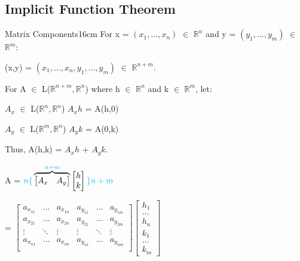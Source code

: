     \vspace{0.5cm}




    
\subsection{ Implicit Function Theorem }

    \begin{definition}{Matrix Components}{16cm}
        For x = $(x_1,...,x_n)$ $\in$ $\mathbb{R}^n$ and
        y = $(y_1,...,y_m)$ $\in$ $\mathbb{R}^m$:

        \hspace{0.5cm}
        (x,y) = $(x_1,...,x_n,y_1,...,y_m)$ $\in$ $\mathbb{R}^{n+m}$.

        For A $\in$ L($\mathbb{R}^{n+m},\mathbb{R}^n$)
        where h $\in$ $\mathbb{R}^n$ and k $\in$ $\mathbb{R}^m$, let:

        \hspace{0.5cm}
        $A_x$ $\in$ L($\mathbb{R}^n,\mathbb{R}^n$)
        \hspace{1cm}
        $A_xh$ = A(h,0)
        
        \hspace{0.5cm}
        $A_y$ $\in$ L($\mathbb{R}^m,\mathbb{R}^n$)
        \hspace{1cm}
        $A_yk$ = A(0,k)

        Thus, A(h,k) = $A_xh$ + $A_yk$.

        \hspace{0.5cm}
        A =
        ${\color{lblue} n \lbrace}
        \overbrace{\begin{bmatrix}
                        A_x & A_y
                    \end{bmatrix}}^{{\color{lblue} n+m}}
        \begin{bmatrix}
            h \\
            k
        \end{bmatrix} {\color{lblue} \rbrace n+m}$
        
        \hspace{0.9cm}
        =
        $\begin{bmatrix}
            a_{x_{11}} & ... & a_{x_{1n}} & a_{y_{11}} & ... & a_{y_{1m}} \\
            a_{x_{21}} & ... & a_{x_{2n}} & a_{y_{21}} & ... & a_{y_{2m}} \\
            \vdots & \ddots & \vdots & \vdots & \ddots & \vdots \\
            a_{x_{n1}} & ... & a_{x_{nn}} & a_{y_{n1}} & ... & a_{y_{nm}} \\
        \end{bmatrix}
        \begin{bmatrix}
            h_1 \\
            ... \\
            h_n \\
            k_1 \\
            ... \\
            k_m
        \end{bmatrix}$


\end{definition}
